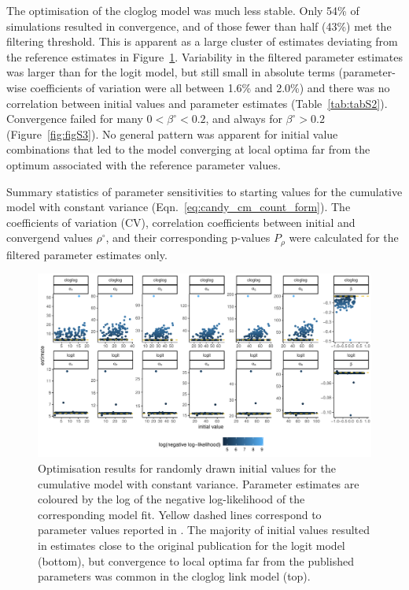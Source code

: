 The optimisation of the cloglog model was much less stable. Only 54\% of simulations resulted in convergence, and of those fewer than half (43\%) met the filtering threshold. This is apparent as a large cluster of estimates deviating from the reference estimates in Figure~\ref{fig:figS1}. Variability in the filtered parameter estimates was larger than for the logit model, but still small in absolute terms (parameter-wise coefficients of variation were all between 1.6\% and 2.0\%) and there was no correlation between initial values and parameter estimates (Table~\ref{tab:tabS2}). Convergence failed for many $0<\beta^{\circ}<0.2$, and always for $\beta^{\circ}>0.2$ (Figure~\ref{fig:figS3}). No general pattern was apparent for initial value combinations that led to the model converging at local optima far from the optimum associated with the reference parameter values.


\begin{table}[bph]
  \small
    \centering
    \caption{Summary statistics of parameter sensitivities to starting values for the cumulative model with constant variance (Eqn.~\ref{eq:candy_cm_count_form}). The coefficients of variation (CV), correlation coefficients between initial and convergend values $\rho^{\circ}$, and their corresponding p-values $P_\rho$ were calculated for the filtered parameter estimates only.
    }
  
  \label{tab:tabS2}
\end{table}


\begin{figure}[htbp]
  \centering
  \includegraphics[width=\textwidth]{../figures/figS1_initial_value_sensitivity_unfiltered.pdf}
  \caption{Optimisation results for randomly drawn initial values for the cumulative model with constant variance. Parameter estimates are coloured by the log of the negative log-likelihood of the corresponding model fit. Yellow dashed lines correspond to parameter values reported in \citep{candy1991modeling}. The majority of initial values resulted in estimates close to the original publication for the logit model (bottom), but convergence to local optima far from the published parameters was common in the cloglog link model (top).}
  \label{fig:figS1}
\end{figure} 

